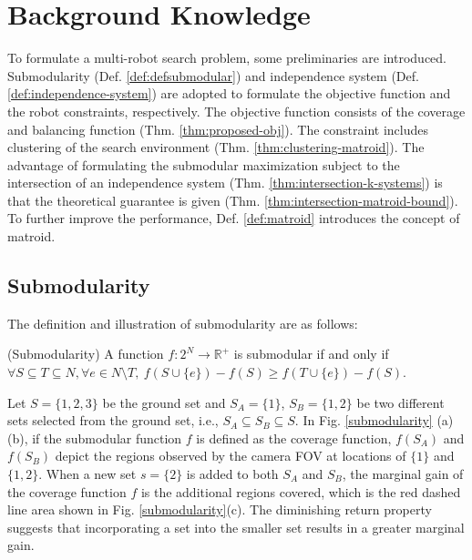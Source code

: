 \chapter{Background Knowledge}
To formulate a multi-robot search problem, some preliminaries are introduced.
Submodularity (Def. \ref{def:defsubmodular}) and independence system (Def. \ref{def:independence-system}) are adopted to formulate the objective function and the robot constraints, respectively.
The objective function consists of the coverage and balancing function (Thm. \ref{thm:proposed-obj}).
The constraint includes clustering of the search environment (Thm. \ref{thm:clustering-matroid}).
The advantage of formulating the submodular maximization subject to the intersection of an independence system (Thm. \ref{thm:intersection-k-systems}) is that the theoretical guarantee is given (Thm. \ref{thm:intersection-matroid-bound}).
To further improve the performance, Def. \ref{def:matroid} introduces the concept of matroid.\\


\section{Submodularity}

The definition and illustration of submodularity are as follows:

\begin{definition} \label{def:defsubmodular} (Submodularity) \cite{nemhauser1978analysis}
A function $f:2^N \rightarrow \mathbb{R}^+$ is submodular if and only if $\forall S \subseteq T \subseteq N, \forall e \in N \setminus T, \ f(S\cup \{e\}) - f(S) \geq f(T\cup \{e\}) - f(S)$. \\
\end{definition}

Let $S=\{1,2,3\}$ be the ground set and $S_A=\{1\}$, $S_B=\{1,2\}$ be two different sets selected from the ground set, i.e., $S_A \subseteq S_B \subseteq S$. In Fig. \ref{submodularity} (a)(b), if the submodular function $f$ is defined as the coverage function, $f(S_A)$ and $f(S_B)$ depict the regions observed by the camera FOV at locations of $\{1\}$ and $\{1,2\}$.
When a new set $s=\{2\}$ is added to both $S_A$ and $S_B$, the marginal gain of the coverage function $f$ is the additional regions covered, which is the red dashed line area shown in Fig. \ref{submodularity}(c). The diminishing return property suggests that incorporating a set into the smaller set results in a greater marginal gain.\\

